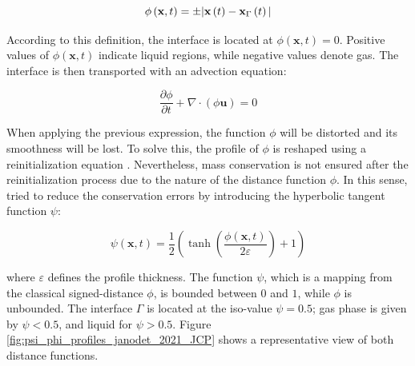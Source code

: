 \begin{equation}
\label{eq:LS_phi_definition}
\phi \left( \textbf{x},t \right)=\pm |\textbf{x}\left( t \right)-\textbf{x}_{\scriptsize{\Gamma}} \left( t \right)|
\end{equation}

According to this definition, the interface is located at $\phi(\textbf{x},t) = 0$. Positive values of $\phi(\textbf{x},t)$ indicate liquid regions, while negative values denote gas. The interface is then transported with an advection equation:

\begin{equation}
	\label{eq:LS_classical_advection}
	\frac{\partial \phi}{\partial t} + \nabla \cdot \left( \phi \boldsymbol{u} \right) = 0
\end{equation}

When applying the previous expression, the function $\phi$ will be distorted and its smoothness will be lost. To solve this, the profile of $\phi$ is reshaped using a reinitialization equation . Nevertheless, mass conservation is not ensured after the reinitialization process due to the nature of the distance function $\phi$. In this sense,  tried to reduce the conservation errors by introducing the hyperbolic tangent function $\psi$:

\begin{equation}
\label{eq:ACLS_psi_definition}
\psi \left( \textbf{x},t \right)=\frac{1}{2} \left(\tanh\left(\frac{\phi(\textbf{x},t)}{2\varepsilon}\right)+1\right)
\end{equation}

where $\varepsilon$ defines the profile thickness. The function $\psi$, which is a mapping from the classical signed-distance $\phi$, is bounded between $0$ and $1$, while $\phi$ is unbounded. The interface $\Gamma$ is located at the iso-value $\psi = 0.5$; gas phase is given by $\psi < 0.5$, and liquid for $\psi > 0.5$. Figure \ref{fig:psi_phi_profiles_janodet_2021_JCP} shows a representative view of both distance functions.

